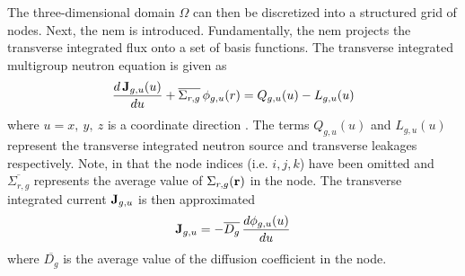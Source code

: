     The three-dimensional domain $\Omega$ can then be discretized into a
    structured grid of nodes. Next, the \gls{nem} is introduced. Fundamentally,
    the \gls{nem} projects the transverse integrated flux onto a set of basis
    functions. The transverse integrated multigroup neutron equation is given as
    \begin{equation}
      \label{eq:transverse_multigroup_diffusion}
      \frac{d \, \mathbf{J}_{g,u} (u)}{d u} + \overline{\Sigma_{r,g}} \,
        \phi_{g,u}(r) = Q_{g,u}(u) - L_{g,u}(u)
    \end{equation}
    where $u = x,\ y,\ z$ is a coordinate direction \cite{qe2paper}. The terms 
    $Q_{g,u}(u)$ and $L_{g,u}(u)$ represent the transverse integrated neutron
    source and transverse leakages respectively. Note, in
     that the node indices (i.e.
    $i,j,k$) have been omitted and $\overline{\Sigma_{r,g}}$ represents the
    average value of $\Sigma_{r,g}(\mathbf{r})$ in the node. The transverse integrated
    current $\mathbf{J}_{g,u}$ is then approximated
    \begin{equation}
      \label{eq:current_approximation}
      \mathbf{J}_{g,u} = - \overline{D_g} \, \frac{d \phi_{g,u}(u)}{du}
    \end{equation}
    where $\overline{D_g}$ is the average value of the diffusion coefficient in
    the node.

